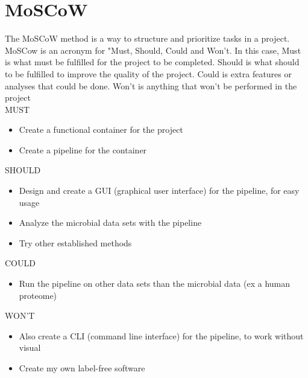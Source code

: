 \section{MoSCoW}

The MoSCoW method is a way to structure and prioritize tasks in a project. MoSCow is an acronym for "Must, Should, Could and Won't. In this case, Must is what must be fulfilled for the project to be completed. Should is what should to be fulfilled to improve the quality of the project. Could is extra features or analyses that could be done. Won't is anything that won't be performed in the project\\

{\Large MUST}
\begin{itemize}
  \item Create a functional container for the project
  \item Create a pipeline for the container
\end{itemize}

{\Large SHOULD}
\begin{itemize}
  \item Design and create a GUI (graphical user interface) for the pipeline, for easy usage
  \item Analyze the microbial data sets with the pipeline
  \item Try other established methods
\end{itemize}

{\Large COULD}
\begin{itemize}
  \item Run the pipeline on other data sets than the microbial data (ex a human proteome)
\end{itemize}

{\Large WON'T}
\begin{itemize}
  \item Also create a CLI (command line interface) for the pipeline, to work without visual
  \item Create my own label-free software
\end{itemize}
